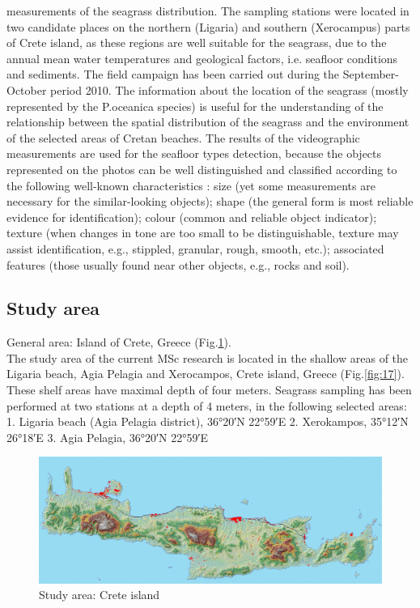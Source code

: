 \documentclass[10pt, a4paper]{article}
\begin{document}
measurements of the seagrass distribution.
The sampling stations were located in two candidate places on the northern (Ligaria) and southern
(Xerocampus) parts of Crete island, as these regions are well suitable for the seagrass, due to the
annual mean water temperatures and geological factors, i.e. seafloor conditions and sediments. The
field campaign has been carried out during the September-October period 2010. 
The information about the location of the seagrass (mostly represented by the P.oceanica species) is useful for the
understanding of the relationship between the spatial distribution of the seagrass and the environment
of the selected areas of Cretan beaches. The results of the videographic measurements are used for the
seafloor types detection, because the objects represented on the photos can be well distinguished and
classified according to the following well-known characteristics \cite{Butler87}\label{Butler87}: size (yet some
measurements are necessary for the similar-looking objects); shape (the general form is most reliable
evidence for identification); colour (common and reliable object indicator); texture (when changes in
tone are too small to be distinguishable, texture may assist identification, e.g., stippled, granular,
rough, smooth, etc.); associated features (those usually found near other objects, e.g., rocks and soil).

\subsection{Study area}
General area: Island of Crete, Greece (Fig.\ref{fig:16}).\\
The study area of the current MSc research is located in the shallow areas of the Ligaria beach, Agia
Pelagia and Xerocampos, Crete island, Greece (Fig.\ref{fig:17}). These shelf areas have maximal depth of four meters.
Seagrass sampling has been performed at two stations at a depth of 4 meters, in the following selected
areas:
1. Ligaria beach (Agia Pelagia district), 36°20′N 22°59′E
2. Xerokampos, 35°12′N 26°18′E
3. Agia Pelagia, 36°20′N 22°59′E

\begin{figure}[h]
\centering
\includegraphics[scale=0.10]{Fig-16.jpg}
\caption{Study area: Crete island}
\label{fig:16}
\end{figure}
\end{document}
